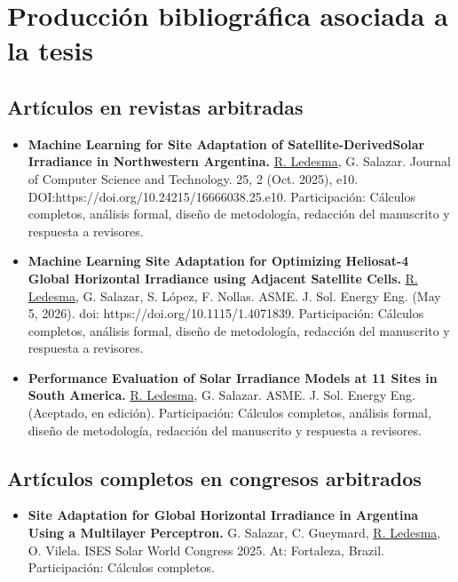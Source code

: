 \rhead{}
\lhead{}
\renewcommand{\headrulewidth}{0pt}


\section*{Producción bibliográfica asociada a la tesis}


\subsection*{Artículos en revistas arbitradas}



\begin{itemize}
\item \textbf{Machine Learning for Site Adaptation of Satellite-DerivedSolar Irradiance in Northwestern Argentina.} \underline{R. Ledesma}, G. Salazar. Journal of Computer Science and Technology. 25, 2 (Oct. 2025), e10. DOI:https://doi.org/10.24215/16666038.25.e10. Participación: Cálculos completos, análisis formal, diseño de metodología, redacción del manuscrito y respuesta a revisores.

\item \textbf{Machine Learning Site Adaptation for Optimizing Heliosat-4 Global Horizontal Irradiance using Adjacent Satellite Cells.} \underline{R. Ledesma}, G. Salazar, S. López, F. Nollas. ASME. J. Sol. Energy Eng. (May 5, 2026). doi: https://doi.org/10.1115/1.4071839. Participación: Cálculos completos, análisis formal, diseño de metodología, redacción del manuscrito y respuesta a revisores.


\item \textbf{Performance Evaluation of Solar Irradiance Models at 11 Sites in South America.}  \underline{R. Ledesma}, G. Salazar. ASME. J. Sol. Energy Eng. (Aceptado, en edición). Participación: Cálculos completos, análisis formal, diseño de metodología, redacción del manuscrito y respuesta a revisores.

\end{itemize}


\subsection*{Artículos completos en congresos arbitrados}
\begin{itemize}

\item \textbf{Site Adaptation for Global Horizontal Irradiance in Argentina Using a Multilayer Perceptron.} G. Salazar, C. Gueymard, \underline{R. Ledesma}, O. Vilela.  ISES Solar World Congress 2025. At: Fortaleza, Brazil. Participación: Cálculos completos.
\end{itemize}

